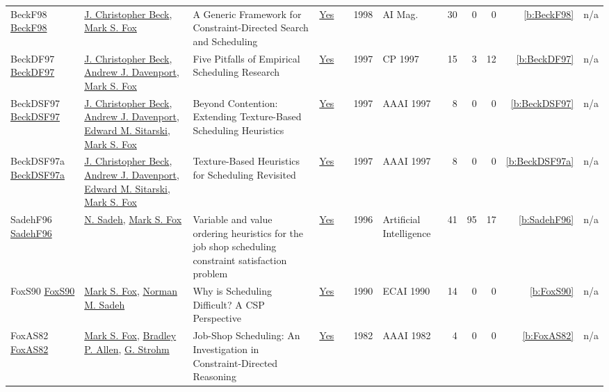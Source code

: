 {\begin{longtable}{>{\raggedright\arraybackslash}p{3cm}>{\raggedright\arraybackslash}p{6cm}>{\raggedright\arraybackslash}p{6.5cm}rrrp{2.5cm}rrrrr}
BeckF98 \href{https://doi.org/10.1609/aimag.v19i4.1426}{BeckF98} & \hyperref[auth:a89]{J. Christopher Beck}, \hyperref[auth:a304]{Mark S. Fox} & A Generic Framework for Constraint-Directed Search and Scheduling & \href{../works/BeckF98.pdf}{Yes} & \cite{BeckF98} & 1998 & {AI} Mag. & 30 & 0 & 0 & \ref{b:BeckF98} & n/a\\
BeckDF97 \href{https://doi.org/10.1007/BFb0017455}{BeckDF97} & \hyperref[auth:a89]{J. Christopher Beck}, \hyperref[auth:a250]{Andrew J. Davenport}, \hyperref[auth:a304]{Mark S. Fox} & Five Pitfalls of Empirical Scheduling Research & \href{../works/BeckDF97.pdf}{Yes} & \cite{BeckDF97} & 1997 & CP 1997 & 15 & 3 & 12 & \ref{b:BeckDF97} & n/a\\
BeckDSF97 \href{http://www.aaai.org/Library/AAAI/1997/aaai97-037.php}{BeckDSF97} & \hyperref[auth:a89]{J. Christopher Beck}, \hyperref[auth:a250]{Andrew J. Davenport}, \hyperref[auth:a1311]{Edward M. Sitarski}, \hyperref[auth:a304]{Mark S. Fox} & Beyond Contention: Extending Texture-Based Scheduling Heuristics & \href{../works/BeckDSF97.pdf}{Yes} & \cite{BeckDSF97} & 1997 & AAAI 1997 & 8 & 0 & 0 & \ref{b:BeckDSF97} & n/a\\
BeckDSF97a \href{http://www.aaai.org/Library/AAAI/1997/aaai97-038.php}{BeckDSF97a} & \hyperref[auth:a89]{J. Christopher Beck}, \hyperref[auth:a250]{Andrew J. Davenport}, \hyperref[auth:a1311]{Edward M. Sitarski}, \hyperref[auth:a304]{Mark S. Fox} & Texture-Based Heuristics for Scheduling Revisited & \href{../works/BeckDSF97a.pdf}{Yes} & \cite{BeckDSF97a} & 1997 & AAAI 1997 & 8 & 0 & 0 & \ref{b:BeckDSF97a} & n/a\\
SadehF96 \href{http://dx.doi.org/10.1016/0004-3702(95)00098-4}{SadehF96} & \hyperref[auth:a1185]{N. Sadeh}, \hyperref[auth:a304]{Mark S. Fox} & Variable and value ordering heuristics for the job shop scheduling constraint satisfaction problem & \href{../works/SadehF96.pdf}{Yes} & \cite{SadehF96} & 1996 & Artificial Intelligence & 41 & 95 & 17 & \ref{b:SadehF96} & n/a\\
FoxS90 \href{}{FoxS90} & \hyperref[auth:a304]{Mark S. Fox}, \hyperref[auth:a1058]{Norman M. Sadeh} & Why is Scheduling Difficult? {A} {CSP} Perspective & \href{../works/FoxS90.pdf}{Yes} & \cite{FoxS90} & 1990 & ECAI 1990 & 14 & 0 & 0 & \ref{b:FoxS90} & n/a\\
FoxAS82 \href{http://www.aaai.org/Library/AAAI/1982/aaai82-037.php}{FoxAS82} & \hyperref[auth:a304]{Mark S. Fox}, \hyperref[auth:a1018]{Bradley P. Allen}, \hyperref[auth:a1019]{G. Strohm} & Job-Shop Scheduling: An Investigation in Constraint-Directed Reasoning & \href{../works/FoxAS82.pdf}{Yes} & \cite{FoxAS82} & 1982 & AAAI 1982 & 4 & 0 & 0 & \ref{b:FoxAS82} & n/a\\
\end{longtable}
}

